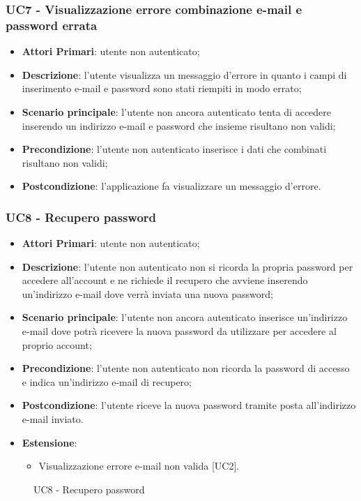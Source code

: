 \subsubsection{UC7 - Visualizzazione errore combinazione e-mail e password errata}
\begin{itemize}
	\item \textbf{Attori Primari}: utente non autenticato;
	\item \textbf{Descrizione}: l'utente visualizza un messaggio d'errore in quanto i campi di inserimento e-mail e password sono stati riempiti in modo errato;
	\item \textbf{Scenario principale}: l'utente non ancora autenticato tenta di accedere inserendo un indirizzo e-mail e password che insieme risultano non validi;	
	\item \textbf{Precondizione}: l'utente non autenticato inserisce i dati che combinati risultano non validi;
	\item \textbf{Postcondizione}: l'applicazione fa visualizzare un messaggio d'errore.
\end{itemize}

\subsubsection{UC8 - Recupero password}
\begin{itemize}
	\item \textbf{Attori Primari}: utente non autenticato;
	\item \textbf{Descrizione}: l'utente non autenticato non si ricorda la propria password per accedere all'account e ne richiede il recupero che avviene inserendo un'indirizzo e-mail dove verrà inviata una nuova password;
	\item \textbf{Scenario principale}: l'utente non ancora autenticato inserisce un'indirizzo e-mail dove potrà ricevere la nuova password da utilizzare per accedere al proprio account; 
	\item \textbf{Precondizione}: l'utente non autenticato non ricorda la password di accesso e indica un'indirizzo e-mail di recupero;
	\item \textbf{Postcondizione}: l'utente riceve la nuova password tramite posta all'indirizzo e-mail inviato.
	\item \textbf{Estensione}:
		\begin{itemize}
			\item Visualizzazione errore e-mail non valida [UC2].
		\end{itemize}
\end{itemize}
\begin{figure}[h]
	\centering
	\caption{UC8 - Recupero password}
\end{figure}

